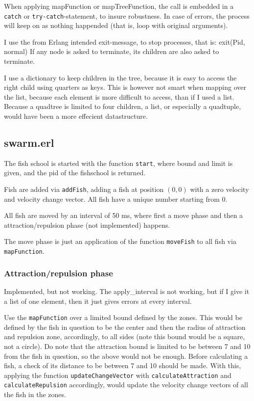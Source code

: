 \documentclass[a4paper, 10pt]{article}
\renewenvironment{verbatim}{}{}
\begin{document}
When applying mapFunction or mapTreeFunction, the call is embedded in a \texttt{catch} or \texttt{try-catch}-statement, to insure robustness. In case of errors, the process will keep on as nothing happended (that is, loop with original arguments).

I use the from Erlang intended exit-message, to stop processes, that is:
\begin{verbatim}
exit(Pid, normal)
\end{verbatim}
If any node is asked to terminate, its children are also asked to terminate.

I use a dictionary to keep children in the tree, because it is easy to access the right child using quarters as keys. This is however not smart when mapping over the list, because each element is more difficult to access, than if I used a list. Because a quadtree is limited to four children, a list, or especially a quadtuple, would have been a more effecient datastructure.


\subsection*{swarm.erl}
The fish school is started with the function \texttt{start}, where bound and limit is given, and the pid of the fishschool is returned.

Fish are added via \texttt{addFish}, adding a fish at position $(0,0)$ with a zero velocity and velocity change vector.
All fish have a unique number starting from 0.

All fish are moved by an interval of 50 ms, where first a move phase and then a attraction/repulsion phase (not implemented) happens.

The move phase is just an application of the function \texttt{moveFish} to all fish via \texttt{mapFunction}.

\subsubsection*{Attraction/repulsion phase}
Implemented, but not working. The apply\_interval is not working, but if I give it a list of one element, then it just gives errors at every interval.

Use the \texttt{mapFunction} over a limited bound defined by the zones. This would be defined by the fish in question to be the center and then the radius of attraction and repulsion zone, accordingly, to all sides (note this bound would be a square, not a circle). Do note that the attraction bound is limited to be between 7 and 10 from the fish in question, so the above would not be enough. Before calculating a fish, a check of its distance to be between 7 and 10 should be made.
With this, applying the function \texttt{updateChangeVector} with \texttt{calculateAttraction} and \texttt{calculateRepulsion} accordingly, would update the velocity change vectors of all the fish in the zones.
\end{document}
